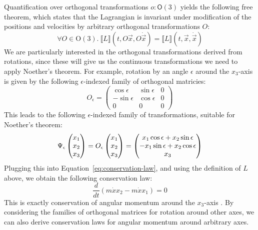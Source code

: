 \documentclass[preprint]{sigplanconf}
\theoremstyle{examplestyle}
\newcommand{\sem}[1]{\llbracket #1 \rrbracket}
\begin{document}
Quantification over orthogonal transformations $o : \mathsf{O}(3)$
yields the following free theorem, which states that the Lagrangian is
invariant under modification of the positions and velocities by
arbitrary orthogonal transformations $O$:
\begin{displaymath}
  \forall O \in \mathrm{O}(3).~\sem{L}(t, O\vec{x}, O\dot{\vec{x}}) = \sem{L}(t, \vec{x}, \dot{\vec{x}})
\end{displaymath}
We are particularly interested in the orthogonal transformations
derived from rotations, since these will give us the continuous
transformations we need to apply Noether's theorem. For example,
rotation by an angle $\epsilon$ around the $x_3$-axis is given by the
following $\epsilon$-indexed family of orthogonal matricies:
\begin{displaymath}
  O_\epsilon =
  \left(
    \begin{array}{ccc}
      \cos \epsilon  & \sin \epsilon & 0 \\
      -\sin \epsilon & \cos \epsilon & 0 \\
      0 & 0 & 0
    \end{array}
  \right)
\end{displaymath}
This leads to the following $\epsilon$-indexed family of
transformations, suitable for Noether's theorem:
\begin{displaymath}
  \Psi_\epsilon\left(\begin{array}{@{}c@{}} x_1 \\ x_2 \\ x_3 \end{array}\right) =
  O_\epsilon \left(\begin{array}{@{}c@{}} x_1 \\ x_2 \\ x_3 \end{array}\right) =
  \left(\begin{array}{@{}c@{}} x_1 \cos \epsilon + x_2 \sin \epsilon \\ - x_1 \sin \epsilon + x_2 \cos \epsilon \\ x_3 \end{array}\right)
\end{displaymath}
Plugging this into Equation~\ref{eq:conservation-law}, and using the
definition of $L$ above, we obtain the following conservation law:
\begin{displaymath}
  \frac{d}{dt}(m\dot{x}x_2 - m\dot{x}x_1) = 0
\end{displaymath}
This is exactly conservation of angular momentum around the $x_3$-axis
\cite{landau60mechanics}. By considering the families of orthogonal
matrices for rotation around other axes, we can also derive
conservation laws for angular momentum around arbitrary axes.
\end{document}
